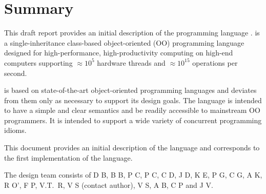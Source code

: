 
\thispagestyle{empty}




\chapter*{Summary}
This draft report provides an initial description of the programming
language \Xten. \Xten{} is a single-inheritance class-based object-oriented
(OO) programming language designed for high-performance, high-productivity
computing on high-end computers supporting $\approx 10^5$ hardware threads
and $\approx 10^{15}$ operations per second. 

{}\Xten{} is based on state-of-the-art object-oriented programming
languages and deviates from them only as necessary to support its
design goals. The language is intended to have a simple and clear
semantics and be readily accessible to mainstream OO programmers. It
is intended to support a wide variety of concurrent programming
idioms.

This document provides an initial description of the language and
corresponds to the first implementation of the language.  

The \Xten{} design team consists of
D B, 
B B, 
P C, 
P C, 
C D, 
J D, 
K E,
P G, 
C G, 
A K, 
R O', 
F P, 
V.T.~R, 
V S (contact author), 
V S,
A B,  
C P
and 
J V.


